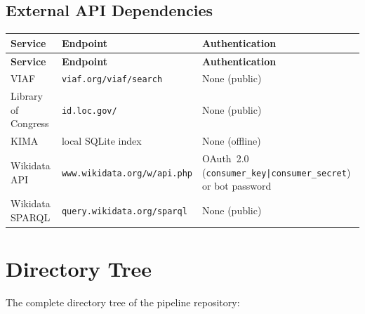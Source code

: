 \documentclass[12pt]{article}
\newcommand{\code}[1]{\texttt{#1}}
\begin{document}
\subsection{External API Dependencies}

\begin{longtable}{|l|l|p{5cm}|}
\hline
\textbf{Service} & \textbf{Endpoint} & \textbf{Authentication} \\
\hline
\endfirsthead
\hline
\textbf{Service} & \textbf{Endpoint} & \textbf{Authentication} \\
\hline
\endhead
\hline
\endfoot
VIAF & \code{viaf.org/viaf/search} & None (public) \\
\hline
Library of Congress & \code{id.loc.gov/} & None (public) \\
\hline
KIMA & local SQLite index & None (offline) \\
\hline
Wikidata API & \code{www.wikidata.org/w/api.php} & OAuth~2.0 (\code{consumer\_key|consumer\_secret}) or bot password \\
\hline
Wikidata SPARQL & \code{query.wikidata.org/sparql} & None (public) \\
\hline
\end{longtable}


\newpage
\appendix
\section{Directory Tree}

The complete directory tree of the pipeline repository:
\end{document}
